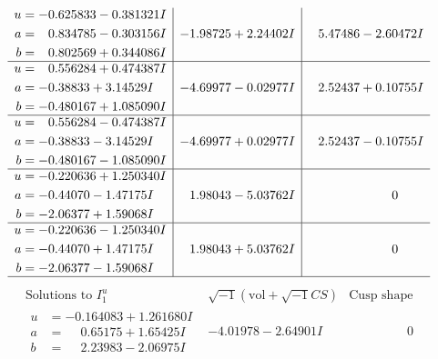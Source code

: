 \documentclass[1p]{elsarticle_modified}
\theoremstyle{definition}
\newcommand{\I}{\sqrt{-1}}
\begin{document}
$$\begin{array}{c|c|c}
\begin{aligned}
u &= -0.625833 - 0.381321 I \\
a &= \phantom{-}0.834785 - 0.303156 I \\
b &= \phantom{-}0.802569 + 0.344086 I\end{aligned}
 & -1.98725 + 2.24402 I & \phantom{-}5.47486 - 2.60472 I \\ \hline\begin{aligned}
u &= \phantom{-}0.556284 + 0.474387 I \\
a &= -0.38833 + 3.14529 I \\
b &= -0.480167 + 1.085090 I\end{aligned}
 & -4.69977 - 0.02977 I & \phantom{-}2.52437 + 0.10755 I \\ \hline\begin{aligned}
u &= \phantom{-}0.556284 - 0.474387 I \\
a &= -0.38833 - 3.14529 I \\
b &= -0.480167 - 1.085090 I\end{aligned}
 & -4.69977 + 0.02977 I & \phantom{-}2.52437 - 0.10755 I \\ \hline\begin{aligned}
u &= -0.220636 + 1.250340 I \\
a &= -0.44070 - 1.47175 I \\
b &= -2.06377 + 1.59068 I\end{aligned}
 & \phantom{-}1.98043 - 5.03762 I & \phantom{-0.000000 } 0 \\ \hline\begin{aligned}
u &= -0.220636 - 1.250340 I \\
a &= -0.44070 + 1.47175 I \\
b &= -2.06377 - 1.59068 I\end{aligned}
 & \phantom{-}1.98043 + 5.03762 I & \phantom{-0.000000 } 0\\
 \hline 
 \end{array}$$\newpage$$\begin{array}{c|c|c}  
\text{Solutions to }I^u_{1}& \I (\text{vol} + \sqrt{-1}CS) & \text{Cusp shape}\\
 \hline 
\begin{aligned}
u &= -0.164083 + 1.261680 I \\
a &= \phantom{-}0.65175 + 1.65425 I \\
b &= \phantom{-}2.23983 - 2.06975 I\end{aligned}
 & -4.01978 - 2.64901 I & \phantom{-0.000000 } 0 \\ \hline\begin{aligned}

\end{aligned}
\end{array}$$
\end{document}
